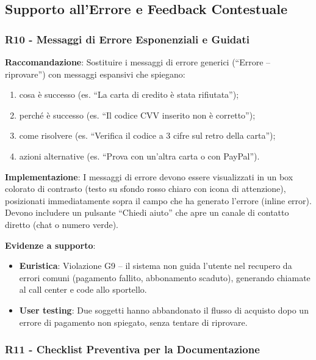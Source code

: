 \documentclass[11pt,a4paper]{article}
\begin{document}
\subsection{Supporto all'Errore e Feedback Contestuale}

\subsubsection{R10 - Messaggi di Errore Esponenziali e Guidati}
\label{rec:R10}

\textbf{Raccomandazione}: Sostituire i messaggi di errore generici
(“Errore -- riprovare”) con messaggi espansivi che spiegano:
\begin{enumerate}
    \item cosa \`e successo (es. “La carta di credito \`e stata rifiutata”);
    \item perch\'e \`e successo (es. “Il codice CVV inserito non \`e corretto”);
    \item come risolvere (es. “Verifica il codice a 3 cifre sul retro della
    carta”);
    \item azioni alternative (es. “Prova con un'altra carta o con PayPal”).
\end{enumerate}

\textbf{Implementazione}: I messaggi di errore devono essere visualizzati in
un box colorato di contrasto (testo su sfondo rosso chiaro con icona di
attenzione), posizionati immediatamente sopra il campo che ha generato
l'errore (inline error). Devono includere un pulsante “Chiedi aiuto” che apre
un canale di contatto diretto (chat o numero verde).

\textbf{Evidenze a supporto}:
\begin{itemize}
    \item \textbf{Euristica}: Violazione G9 -- il sistema non guida l'utente
    nel recupero da errori comuni (pagamento fallito, abbonamento scaduto),
    generando chiamate al call center e code allo sportello.
    \item \textbf{User testing}: Due soggetti hanno abbandonato il flusso di
    acquisto dopo un errore di pagamento non spiegato, senza tentare di
    riprovare.
\end{itemize}

\subsubsection{R11 - Checklist Preventiva per la Documentazione}
\label{rec:R11}
\end{document}

